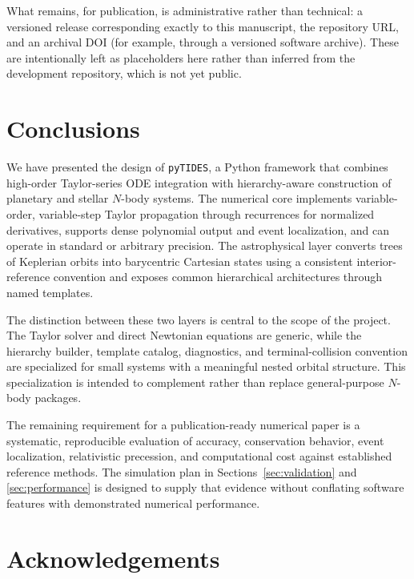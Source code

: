 \documentclass[11pt]{article}
\begin{document}
What remains, for publication, is administrative rather than technical: a
versioned release corresponding exactly to this manuscript, the repository
URL, and an archival DOI (for example, through a versioned software
archive). These are intentionally left as placeholders here rather than
inferred from the development repository, which is not yet public.


\section{Conclusions}
\label{sec:conclusions}

We have presented the design of \texttt{pyTIDES}, a Python framework that
combines high-order Taylor-series ODE integration with hierarchy-aware
construction of planetary and stellar $N$-body systems. The numerical core
implements variable-order, variable-step Taylor propagation through
recurrences for normalized derivatives, supports dense polynomial output and
event localization, and can operate in standard or arbitrary precision. The
astrophysical layer converts trees of Keplerian orbits into barycentric
Cartesian states using a consistent interior-reference convention and
exposes common hierarchical architectures through named templates.

The distinction between these two layers is central to the scope of the
project. The Taylor solver and direct Newtonian equations are generic, while
the hierarchy builder, template catalog, diagnostics, and terminal-collision
convention are specialized for small systems with a meaningful nested orbital
structure. This specialization is intended to complement rather than replace
general-purpose $N$-body packages.

The remaining requirement for a publication-ready numerical paper is a
systematic, reproducible evaluation of accuracy, conservation behavior, event
localization, relativistic precession, and computational cost against
established reference methods. The simulation plan in
Sections~\ref{sec:validation} and \ref{sec:performance} is designed to supply
that evidence without conflating software features with demonstrated
numerical performance.


\section*{Acknowledgements}
\end{document}
